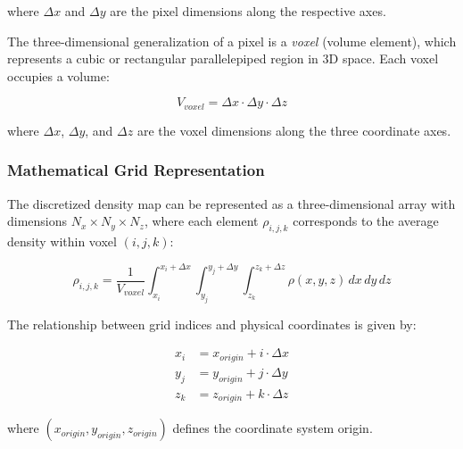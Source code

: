 \documentclass[12pt,a4paper]{article}
\begin{document}
where $\Delta x$ and $\Delta y$ are the pixel dimensions 
along the respective axes.

The three-dimensional generalization of a pixel is a 
\textit{voxel} (volume element), which represents a cubic 
or rectangular parallelepiped region in 3D space. Each voxel 
occupies a volume:

\begin{equation}
V_{voxel} = \Delta x \cdot \Delta y \cdot \Delta z
\end{equation}

where $\Delta x$, $\Delta y$, and $\Delta z$ are the voxel 
dimensions along the three coordinate axes.

\subsubsection{Mathematical Grid Representation}

The discretized density map can be represented as a 
three-dimensional array with dimensions $N_x \times N_y \times N_z$, 
where each element $\rho_{i,j,k}$ corresponds to the average density 
within voxel $(i,j,k)$:

\begin{equation}
\rho_{i,j,k} = \frac{1}{V_{voxel}} \int_{x_i}^{x_i + \Delta x} \int_{y_j}^{y_j + \Delta y} \int_{z_k}^{z_k + \Delta z} \rho(x,y,z) \, dx \, dy \, dz
\end{equation}

The relationship between grid indices and physical coordinates is given by:

\begin{align}
x_i &= x_{origin} + i \cdot \Delta x \\
y_j &= y_{origin} + j \cdot \Delta y \\
z_k &= z_{origin} + k \cdot \Delta z
\end{align}

where $(x_{origin}, y_{origin}, z_{origin})$ defines the coordinate system origin.
\end{document}
